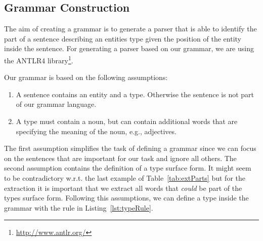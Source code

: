 \begin{table}
\centering
{}
\caption{Examples of sentence parts found between an entity and its type.}
\label{tab:extParts}
\end{table}

\subsection{Grammar Construction}
\label{sec:grammar}

The aim of creating a grammar is to generate a parser that is able to identify the part of a sentence describing an entities type given the position of the entity inside the sentence.
For generating a parser based on our grammar, we are using the ANTLR4 library\footnote{\url{http://www.antlr.org/}}.

Our grammar is based on the following assumptions:
\begin{enumerate}
\item A sentence contains an entity and a type. Otherwise the sentence is not part of our grammar language.
\item A type must contain a noun, but can contain additional words that are specifying the meaning of the noun, e.g., adjectives.
\end{enumerate}

The first assumption simplifies the task of defining a grammar since we can focus on the sentences that are important for our task and ignore all others.
The second assumption contains the definition of a type surface form.
It might seem to be contradictory w.r.t. the last example of Table~\ref{tab:extParts} but for the extraction it is important that we extract all words that \emph{could} be part of the types surface form.
Following this assumptions, we can define a type inside the grammar with the rule in Listing~\ref{lst:typeRule}.

